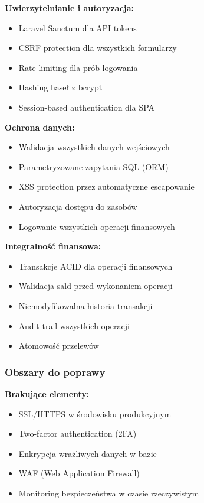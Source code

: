 \documentclass[12pt,a4paper]{article}
\begin{document}
    \textbf{Uwierzytelnianie i autoryzacja:}
    \begin{itemize}
        \item Laravel Sanctum dla API tokens
        \item CSRF protection dla wszystkich formularzy
        \item Rate limiting dla prób logowania
        \item Hashing haseł z bcrypt
        \item Session-based authentication dla SPA
    \end{itemize}

    \textbf{Ochrona danych:}
    \begin{itemize}
        \item Walidacja wszystkich danych wejściowych
        \item Parametryzowane zapytania SQL (ORM)
        \item XSS protection przez automatyczne escapowanie
        \item Autoryzacja dostępu do zasobów
        \item Logowanie wszystkich operacji finansowych
    \end{itemize}

    \textbf{Integralność finansowa:}
    \begin{itemize}
        \item Transakcje ACID dla operacji finansowych
        \item Walidacja sald przed wykonaniem operacji
        \item Niemodyfikowalna historia transakcji
        \item Audit trail wszystkich operacji
        \item Atomowość przelewów
    \end{itemize}

    \subsubsection{Obszary do poprawy}

    \textbf{Brakujące elementy:}
    \begin{itemize}
        \item SSL/HTTPS w środowisku produkcyjnym
        \item Two-factor authentication (2FA)
        \item Enkrypcja wrażliwych danych w bazie
        \item WAF (Web Application Firewall)
        \item Monitoring bezpieczeństwa w czasie rzeczywistym
    \end{itemize}
\end{document}
